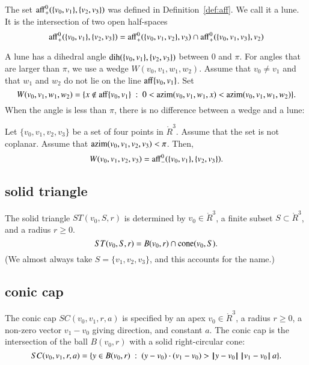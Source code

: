 The set ${\operatorname{aff}}^0_+(\{v_0,v_1\},\{v_2,v_3\})$ was defined
in Definition~\ref{def:aff}.  We call it a lune.  It is the intersection
of two open half-spaces
    $$
    {\operatorname{aff}}^0_+(\{v_0,v_1\},\{v_2,v_3\})
    ={\operatorname{aff}}^0_+(\{v_0,v_1,v_2\},v_3)\cap
    {\operatorname{aff}}^0_+(\{v_0,v_1,v_3\},v_2)
    $$


A lune has a dihedral angle $\operatorname{dih}(\{v_0,v_1\},\{v_2,v_3\})$ between
$0$ and $\pi$.   For angles that are larger than $\pi$,  we use a wedge
$W(v_0,v_1,w_1,w_2)$.  Assume that $v_0\ne v_1$ and that
$w_1$ and $w_2$ do not lie on
the line ${\operatorname{aff}}\{v_0,v_1\}$.  Set
$$
W(v_0,v_1,w_1,w_2) = 
  \{x\not\in{\operatorname{aff}}\{v_0,v_1\} \ :\  
  0< {\operatorname{azim}}(v_0,v_1,w_1,x) < {\operatorname{azim}}(v_0,v_1,w_1,w_2)\}.
$$
When the angle is less than $\pi$, there is no difference between
a wedge and a lune:

\begin{lemma} Let $\{v_0,v_1,v_2,v_3\}$ be a set of four points
in $\ring{R}^3$.  Assume that the set is not coplanar.
Assume that ${\operatorname{azim}}(v_0,v_1,v_2,v_3)<\pi$.
Then,
   $$W(v_0,v_1,v_2,v_3) = {\operatorname{aff}}^0_-(\{v_0,v_1\},\{v_2,v_3\}).$$
\end{lemma}


\subsection{solid triangle}

\begin{definition} The solid triangle $ST(v_0,S,r)$ is
determined by  $v_0\in\ring{R}^3$, a finite subset $S\subset\ring{R}^3$,
and a radius $r\ge0$. 
    $$
    ST(v_0,S,r) = 
    B(v_0,r)\cap {\operatorname{cone}}(v_0,S).
    $$
(We almost always take $S=\{v_1,v_2,v_3\}$, and this accounts for
the name.)
\end{definition}



\subsection{conic cap}


\begin{definition}
The conic cap $SC(v_0,v_1,r,a)$ is specified by an apex
$v_0\in\ring{R}^3$, a radius $r\ge0$, a non-zero vector $v_1-v_0$ giving
direction, and constant $a$.  The conic cap is the intersection of
the ball $B(v_0,r)$ with a solid right-circular cone:
    $$
    SC(v_0,v_1,r,a)=\{y \in B(v_0,r) \ :\  (y-v_0)\cdot (v_1-v_0) > {\hskip0.1em|\hskip-0.15em|\hskip0.1em}y - v_0{\hskip0.1em|\hskip-0.15em|\hskip0.1em}\, {\hskip0.1em|\hskip-0.15em|\hskip0.1em}v_1 - v_0{\hskip0.1em|\hskip-0.15em|\hskip0.1em}\, a\}.
    $$
\end{definition}

